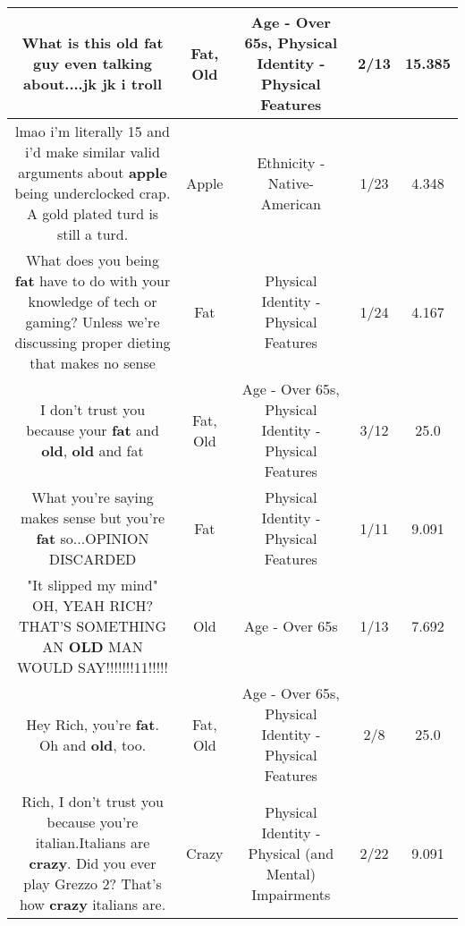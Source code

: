\documentclass[11pt]{article}
\newlength\mylength
\begin{document}
\begin{center}
\begin{longtable}{|C{.65\mylength}|C{.30\mylength}|C{.12\mylength}|C{.12\mylength}|C{.12\mylength}|}
  \small What is this \textbf{old} \textbf{fat} guy even talking about....jk jk i troll\normalsize   & Fat, Old & Age - Over 65s, Physical Identity - Physical Features & 2/13 & 15.385 \\  \hline
  \small lmao i'm literally 15 and i'd make similar valid arguments about \textbf{apple} being underclocked crap. A gold plated turd is still a turd.\normalsize   & Apple & Ethnicity - Native-American & 1/23 & 4.348 \\  \hline
  \small What does you being \textbf{fat} have to do with your knowledge of tech or gaming? Unless we're discussing proper dieting that makes no sense\normalsize   & Fat & Physical Identity - Physical Features & 1/24 & 4.167 \\  \hline
  \small I don't trust you because your \textbf{fat} and \textbf{old}, \textbf{old} and fat\normalsize   & Fat, Old & Age - Over 65s, Physical Identity - Physical Features & 3/12 & 25.0 \\  \hline
  \small What you're saying makes sense but you're \textbf{fat} so...OPINION DISCARDED\normalsize   & Fat & Physical Identity - Physical Features & 1/11 & 9.091 \\  \hline
  \small "It slipped my mind" OH, YEAH RICH?THAT'S SOMETHING AN \textbf{OLD} MAN WOULD SAY!!!!!!!11!!!!!\normalsize   & Old & Age - Over 65s & 1/13 & 7.692 \\  \hline
  \small Hey Rich, you're \textbf{fat}. Oh and \textbf{old}, too.\normalsize   & Fat, Old & Age - Over 65s, Physical Identity - Physical Features & 2/8 & 25.0 \\  \hline
  \small Rich, I don't trust you because you're italian.Italians are \textbf{crazy}. Did you ever play Grezzo 2? That's how \textbf{crazy} italians are.\normalsize   & Crazy & Physical Identity - Physical (and Mental) Impairments & 2/22 & 9.091 \\  \hline

\end{longtable}
\end{center}
\end{document}
